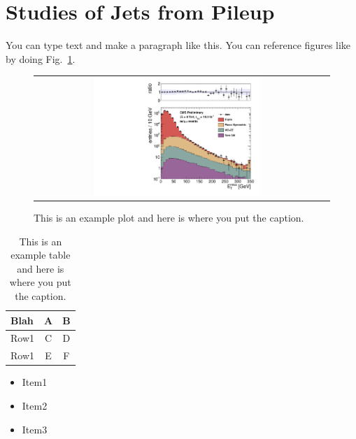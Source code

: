 \clearpage

\section{Studies of Jets from Pileup}
\label{sec:pujets}

You can type text and make a paragraph like this. You can reference figures like by doing Fig.~\ref{fig:example}.



\begin{figure}[!h]
\begin{center}
\begin{tabular}{cc}
\includegraphics[width=0.6\textwidth]{plots/pfmet_all_19fb.pdf}
\end{tabular}
\caption{This is an example plot and here is where you put the caption.
\label{fig:example}
}
\end{center}
\end{figure}


\begin{table}[htb]
\begin{center}
\caption{\label{table:example} This is an example table and here is where you put the caption. }
\begin{tabular}{l|cc}
\hline
\hline
Blah & A & B \\
\hline
Row1 & C & D \\
Row1 & E & F \\
\hline
\hline
\end{tabular}
\end{center}
\end{table}


\begin{itemize}
\item Item1
\item Item2
\item Item3
\end{itemize}

\clearpage
